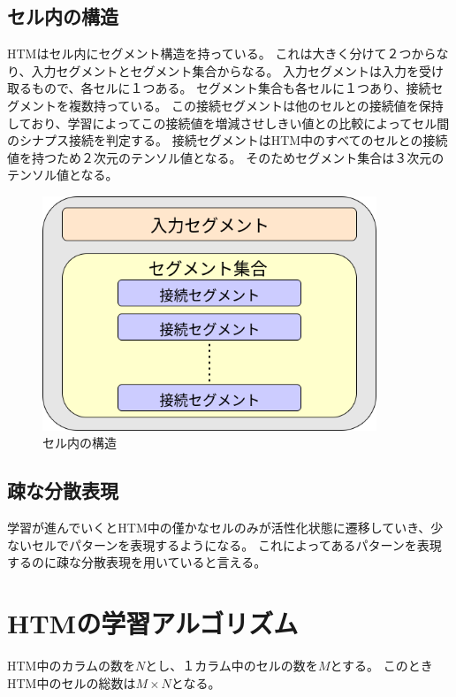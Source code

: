 \subsection{セル内の構造}
HTMはセル内にセグメント構造を持っている。
これは大きく分けて２つからなり、入力セグメントとセグメント集合からなる。
入力セグメントは入力を受け取るもので、各セルに１つある。
セグメント集合も各セルに１つあり、接続セグメントを複数持っている。
この接続セグメントは他のセルとの接続値を保持しており、学習によってこの接続値を増減させしきい値との比較によってセル間のシナプス接続を判定する。
接続セグメントはHTM中のすべてのセルとの接続値を持つため２次元のテンソル値となる。
そのためセグメント集合は３次元のテンソル値となる。

\vspace{5mm}
\begin{figure}[ht]
  \begin{center}
    \includegraphics[width=10cm]{./fig/drawing_4}
    \caption{セル内の構造}
    \label{fig:cell_structure}
  \end{center}
\end{figure}

\subsection{疎な分散表現}
学習が進んでいくとHTM中の僅かなセルのみが活性化状態に遷移していき、少ないセルでパターンを表現するようになる。
これによってあるパターンを表現するのに疎な分散表現を用いていると言える。

\section{HTMの学習アルゴリズム}

HTM中のカラムの数を$N$とし、１カラム中のセルの数を$M$とする。
このときHTM中のセルの総数は$M \times N$となる。

